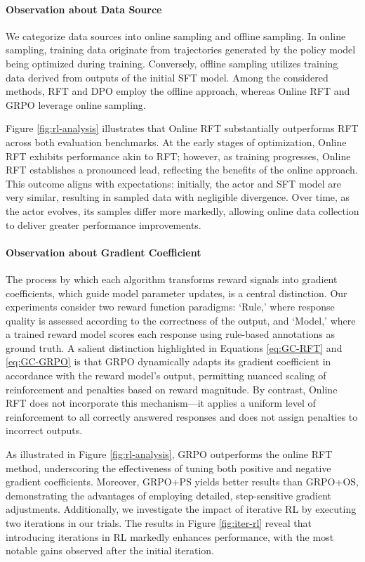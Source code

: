 \paragraph{Observation about Data Source} We categorize data sources into online sampling and offline sampling. In online sampling, training data originate from trajectories generated by the policy model being optimized during training. Conversely, offline sampling utilizes training data derived from outputs of the initial SFT model. Among the considered methods, RFT and DPO employ the offline approach, whereas Online RFT and GRPO leverage online sampling.

Figure \ref{fig:rl-analysis} illustrates that Online RFT substantially outperforms RFT across both evaluation benchmarks. At the early stages of optimization, Online RFT exhibits performance akin to RFT; however, as training progresses, Online RFT establishes a pronounced lead, reflecting the benefits of the online approach. This outcome aligns with expectations: initially, the actor and SFT model are very similar, resulting in sampled data with negligible divergence. Over time, as the actor evolves, its samples differ more markedly, allowing online data collection to deliver greater performance improvements.

\paragraph{Observation about Gradient Coefficient} The process by which each algorithm transforms reward signals into gradient coefficients, which guide model parameter updates, is a central distinction. Our experiments consider two reward function paradigms: `Rule,' where response quality is assessed according to the correctness of the output, and `Model,' where a trained reward model scores each response using rule-based annotations as ground truth. A salient distinction highlighted in Equations \ref{eq:GC-RFT} and \ref{eq:GC-GRPO} is that GRPO dynamically adapts its gradient coefficient in accordance with the reward model's output, permitting nuanced scaling of reinforcement and penalties based on reward magnitude. By contrast, Online RFT does not incorporate this mechanism—it applies a uniform level of reinforcement to all correctly answered responses and does not assign penalties to incorrect outputs.

As illustrated in Figure \ref{fig:rl-analysis}, GRPO outperforms the online RFT method, underscoring the effectiveness of tuning both positive and negative gradient coefficients. Moreover, GRPO+PS yields better results than GRPO+OS, demonstrating the advantages of employing detailed, step-sensitive gradient adjustments. Additionally, we investigate the impact of iterative RL by executing two iterations in our trials. The results in Figure \ref{fig:iter-rl} reveal that introducing iterations in RL markedly enhances performance, with the most notable gains observed after the initial iteration.

